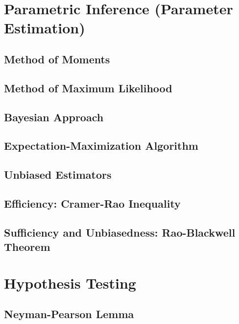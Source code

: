 \documentclass[
  openany]{book}
\theoremstyle{definition}
\theoremstyle{definition}
\theoremstyle{definition}
\theoremstyle{definition}
\theoremstyle{remark}
\begin{document}
\chapter{Parametric Inference (Parameter Estimation)}\label{parametric-inference-parameter-estimation}

\section{Method of Moments}\label{method-of-moments-1}

\section{Method of Maximum Likelihood}\label{method-of-maximum-likelihood}

\section{Bayesian Approach}\label{bayesian-approach}

\section{Expectation-Maximization Algorithm}\label{expectation-maximization-algorithm}

\section{Unbiased Estimators}\label{unbiased-estimators}

\section{Efficiency: Cramer-Rao Inequality}\label{efficiency-cramer-rao-inequality}

\section{Sufficiency and Unbiasedness: Rao-Blackwell Theorem}\label{sufficiency-and-unbiasedness-rao-blackwell-theorem}

\chapter{Hypothesis Testing}\label{hypothesis-testing}

\section{Neyman-Pearson Lemma}\label{neyman-pearson-lemma}
\end{document}
